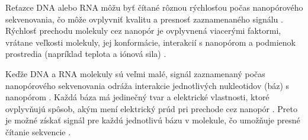 Reťazce DNA alebo RNA môžu byť čítané rôznou rýchlosťou počas nanopórového sekvenovania, čo môže ovplyvniť kvalitu a presnosť zaznamenaného signálu \cite{Zheng2023Nanopore}.
Rýchlosť prechodu molekuly cez nanopór je ovplyvnená viacerými faktormi, vrátane veľkosti molekuly, jej konformácie, interakcií s nanopórom a podmienok prostredia (napríklad teplota a iónová sila) \cite{Zheng2023Nanopore}.

Keďže DNA a RNA molekuly sú veľmi malé, signál zaznamenaný počas nanopórového sekvenovania odráža interakcie jednotlivých nukleotidov (báz) s nanopórom \cite{Zheng2023Nanopore}.
Každá báza má jedinečný tvar a elektrické vlastnosti, ktoré ovplyvňujú spôsob, akým mení elektrický prúd pri prechode cez nanopór \cite{Zheng2023Nanopore}.
Preto je možné získať signál pre každú jednotlivú bázu v molekule, čo umožňuje presné čítanie sekvencie \cite{Zheng2023Nanopore}.
